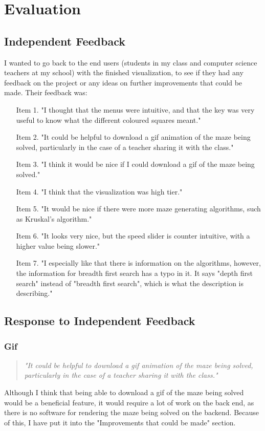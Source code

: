 \documentclass[titlepage]{article}
\begin{document}
\section{Evaluation}
\subsection{Independent Feedback}
I wanted to go back to the end users (students in my class and computer science teachers at my school) with the finished visualization, to see if they had any feedback on the project or any ideas on further improvements that could be made.
Their feedback was:
\begin{itemize}
    \item[Item 1.]"I thought that the menus were intuitive, and that the key was very useful to know what the different coloured squares meant."
    \item[Item 2.]"It could be helpful to download a gif animation of the maze being solved, particularly in the case of a teacher sharing it with the class." 
    \item[Item 3.]"I think it would be nice if I could download a gif of the maze being solved."    
    \item[Item 4.]"I think that the visualization was high tier."
    \item[Item 5.]"It would be nice if there were more maze generating algorithms, such as Kruskal's algorithm." 
    \item[Item 6.]"It looks very nice, but the speed slider is counter intuitive, with a higher value being slower."
    \item[Item 7.]"I especially like that there is information on the algorithms, however, the information for breadth first search has a typo in it. It says "depth first search" instead of "breadth first search", which is what the description is describing."   
\end{itemize}
\subsection{Response to Independent Feedback}

\subsubsection{Gif}
\begin{quote}
    \textit{
        "It could be helpful to download a gif animation of the maze being solved, particularly in the case of a teacher sharing it with the class."
    }
\end{quote}
Although I think that being able to download a gif of the maze being solved would be a beneficial feature, it would require a lot of work on the back end, as there is no software for rendering the maze being solved on the backend. Because of this, I have put it into the "Improvements that could be made" section.
\end{document}
